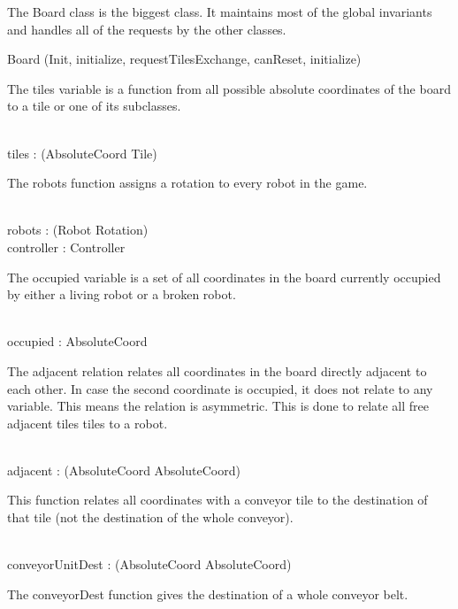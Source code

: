\documentclass[12pt]{article}
\begin{document}
The Board class is the biggest class. It maintains most of the global invariants and handles all of the requests by the other classes.
\begin{class}{Board}
\upharpoonright (Init, initialize, requestTilesExchange, canReset, initialize) \\
\begin{nobottomstate}
\begin{zpar}
The tiles variable is a function from all possible absolute coordinates of the board to a tile or one of its subclasses.
\end{zpar} \\
tiles : \power (AbsoluteCoord \fun \: \downarrow \! Tile) \\
\also \also \also
\begin{zpar}
The robots function assigns a rotation to every robot in the game.
\end{zpar} \\
robots : \power (Robot \pfun Rotation) \\
\also \also \also
controller : Controller \\
\also \also \also
\begin{zpar}
The occupied variable is a set of all coordinates in the board currently occupied by either a living robot or a broken robot.
\end{zpar} \\
occupied : \power AbsoluteCoord \\
\also \also \also
\begin{zpar}
The adjacent relation relates all coordinates in the board directly adjacent to each other. In case the second coordinate is occupied, it does not relate to any variable.
This means the relation is asymmetric. This is done to relate all free adjacent tiles tiles to a robot.
\end{zpar} \\
adjacent : \power (AbsoluteCoord \rel AbsoluteCoord) \\
\also \also \also
\begin{zpar}
This function relates all coordinates with a conveyor tile to the destination of that tile (not the destination of the whole conveyor).
\end{zpar} \\
conveyorUnitDest : \power (AbsoluteCoord \pinj AbsoluteCoord) \\
\also \also \also
\begin{zpar}
The conveyorDest function gives the destination of a whole conveyor belt.

\end{zpar}
\end{nobottomstate}
\end{class}
\end{document}
